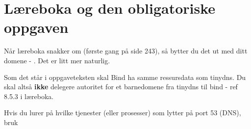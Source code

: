 \section{Læreboka og den obligatoriske oppgaven}

Når læreboka snakker om  (første gang på side 243),
så bytter du det ut med ditt domene - . Det er litt 
mer naturlig.

Som det står i oppgaveteksten skal Bind ha samme ressursdata som
tinydns. Du skal altså \textbf{ikke} delegere autoritet for et barnedomene fra
tinydns til bind - ref 8.5.3 i læreboka.

Hvis du lurer på hvilke tjenester (eller prosesser)
som lytter på port 53 (DNS), bruk


